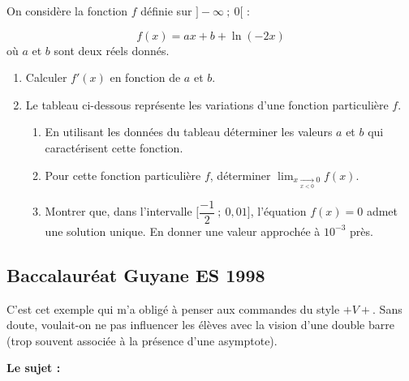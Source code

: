 \begin{tkzexample}
	On considère la fonction $f$ définie sur $]-\infty~;~0[$ :

	\[
	  f(x)=ax+b+\ln(-2x)
	\]
	où $a$ et $b$ sont deux réels donnés.

	\begin{enumerate}
	\item Calculer $f'(x)$ en fonction de $a$ et $b$.
	\item Le tableau ci-dessous représente les variations d'une fonction particulière $f$.

	\medskip
	\begin{center}
	\end{center}

	\medskip
	\begin{enumerate}
	\item En utilisant les données du tableau déterminer les valeurs $a$ et $b$ qui caractérisent
	 cette fonction.
	\item Pour cette fonction particulière $f$, déterminer
	        $\displaystyle \lim_{x \xrightarrow[x<0]{} 0} f(x)$.
	\item Montrer que, dans l'intervalle $\Big[\dfrac{-1}{2}~;~0,01\Big]$, l'équation $f(x)=0$
	 admet une solution unique. En donner une valeur approchée à $10^{-3}$ près.
	\end{enumerate}
	\end{enumerate}
\end{tkzexample}



\subsection{Baccalauréat Guyane ES 1998 }
C'est cet exemple qui m'a obligé à penser aux   commandes du style $+V+$. Sans doute, voulait-on ne pas influencer les élèves avec la vision d'une double barre (trop souvent associée à la présence d'une asymptote).

\textbf{Le sujet :}

